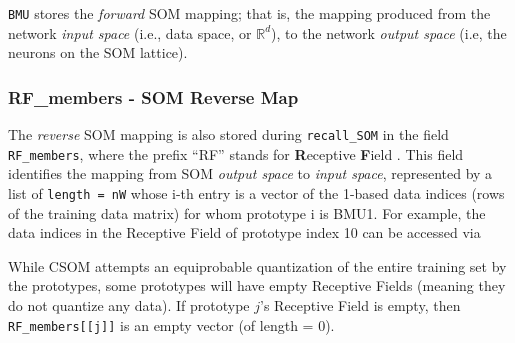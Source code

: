 \documentclass[]{article}
\newenvironment{Shaded}{\begin{snugshade}}{\end{snugshade}}
\newcommand{\CommentTok}[1]{\textcolor[rgb]{0.56,0.35,0.01}{\textit{#1}}}
\newcommand{\DecValTok}[1]{\textcolor[rgb]{0.00,0.00,0.81}{#1}}
\newcommand{\NormalTok}[1]{#1}
\newcommand{\OperatorTok}[1]{\textcolor[rgb]{0.81,0.36,0.00}{\textbf{#1}}}
\begin{document}
\texttt{BMU} stores the \emph{forward} SOM mapping; that is, the mapping produced from the network \emph{input space} (i.e., data space, or \(\mathbb{R}^d\)), to the network \emph{output space} (i.e, the neurons on the SOM lattice).

\hypertarget{rf_members---som-reverse-map}{%
\subsubsection{RF\_members - SOM Reverse Map}\label{rf_members---som-reverse-map}}

The \emph{reverse} SOM mapping is also stored during \texttt{recall\_SOM} in the field \texttt{RF\_members}, where the prefix ``RF'' stands for \textbf{R}eceptive \textbf{F}ield . This field identifies the mapping from SOM \emph{output space} to \emph{input space}, represented by a list of \texttt{length\ =\ nW} whose i-th entry is a vector of the 1-based data indices (rows of the training data matrix) for whom prototype i is BMU1. For example, the data indices in the Receptive Field of prototype index 10 can be accessed via

\begin{Shaded}
\end{Shaded}

While CSOM attempts an equiprobable quantization of the entire training set by the prototypes, some prototypes will have empty Receptive Fields (meaning they do not quantize any data). If prototype \(j\)'s Receptive Field is empty, then \texttt{RF\_members{[}{[}j{]}{]}} is an empty vector (of length = 0).
\end{document}
